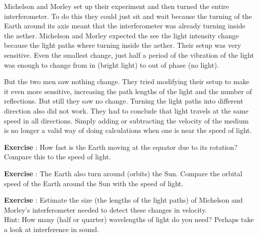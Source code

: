 Michelson and Morley set up their experiment and then turned the entire interferometer. To do this they could just sit and wait because the turning of the Earth around its axis meant that the interferometer was already turning inside the aether. Michelson and Morley expected the see the light intensity change because the light paths where turning inside the aether. Their setup was very sensitive. Even the smallest change, just half a period of the vibration of the light was enough to change from in (bright light) to out of phase (no light).

But the two men saw nothing change. They tried modifying their setup to make it even more sensitive, increasing the path lengths of the light and the number of reflections. But still they saw no change. Turning the light paths into different direction also did not work. They had to conclude that light travels at the same speed in all directions. Simply adding or subtracting the velocity of the medium is no longer a valid way of doing calculations when one is near the speed of light.

\begin{shaded}
\textbf{Exercise \theExercise {}} : How fast is the Earth moving at the equator due to its rotation? Compare this to the speed of light.\end{shaded}
\begin{shaded}
\textbf{Exercise \theExercise {}} : The Earth also turn around (orbits) the Sun. Compare the orbital speed of the Earth around the Sun with the speed of light.\end{shaded}
\begin{shaded}
\textbf{Exercise \theExercise {}} : Estimate the size (the lengths of the light paths) of Michelson and Morley's interferometer needed to detect these changes in velocity.\\
Hint: How many (half or quarter) wavelengths of light do you need? Perhaps take a look at interference in sound.\end{shaded}




